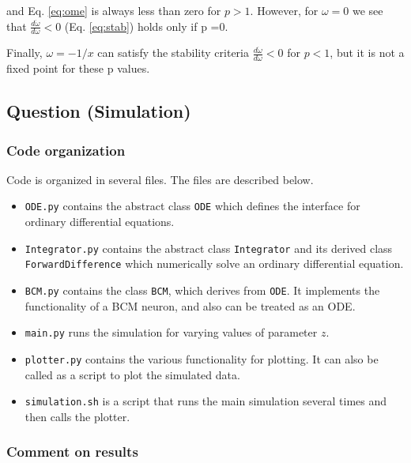 and Eq. \ref{eq:ome} is always less than zero for $p > 1$. However, for $\omega = 0$ we see that $\frac{d\dot \omega}{d\omega} <0$ (Eq. \ref{eq:stab}) holds only if p =0. 

Finally, $\omega = -1/x$ can satisfy the stability criteria $\frac{d\dot \omega}{d\omega} <0$ for $p < 1$, but it is not a fixed point for these p values.




\subsection{Question (Simulation)}     %

\subsubsection{Code organization}

Code is organized in several files. The files are described below.
\begin{itemize}
    \item \texttt{ODE.py} contains the abstract class \texttt{ODE} which defines
        the interface for ordinary differential equations.
    \item \texttt{Integrator.py} contains the abstract class \texttt{Integrator}
        and its derived class \texttt{ForwardDifference} which numerically solve
        an ordinary differential equation.
    \item \texttt{BCM.py} contains the class \texttt{BCM}, which derives from
        \texttt{ODE}. It implements the functionality of a BCM neuron, and also
        can be treated as an ODE.
    \item \texttt{main.py} runs the simulation for varying values of parameter
        $z$.
    \item \texttt{plotter.py} contains the various functionality for plotting.
        It can also be called as a script to plot the simulated data.
    \item \texttt{simulation.sh} is a script that runs the main simulation
        several times and then calls the plotter.
\end{itemize}


\subsubsection{Comment on results}


